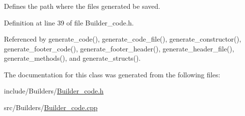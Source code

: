 \hypertarget{classgenevalmag_1_1Builder__code_a7e921a42176e2397ec0a34308408ab4c}{
\subsubsection[{path\_\-output}]{}}
\label{classgenevalmag_1_1Builder__code_a7e921a42176e2397ec0a34308408ab4c}


Defines the path where the files generated be saved. 



Definition at line 39 of file Builder\_\-code.h.



Referenced by generate\_\-code(), generate\_\-code\_\-file(), generate\_\-constructor(), generate\_\-footer\_\-code(), generate\_\-footer\_\-header(), generate\_\-header\_\-file(), generate\_\-methods(), and generate\_\-structs().



The documentation for this class was generated from the following files:\begin{DoxyCompactItemize}
\item 
include/Builders/\hyperlink{Builder__code_8h}{Builder\_\-code.h}\item 
src/Builders/\hyperlink{Builder__code_8cpp}{Builder\_\-code.cpp}\end{DoxyCompactItemize}
